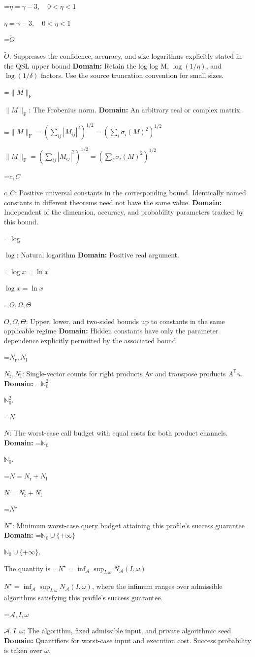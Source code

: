 \documentclass[10pt,a4paper]{article}
\newcommand{\AtlasMath}[1]{\par\begingroup\centering\setbox0=\hbox{$\displaystyle #1$}\ifdim\wd0>1.4\linewidth\typeout{ATLAS WIDE FORMULA: \the\wd0}\fi\ifdim\wd0>\linewidth\resizebox{\linewidth}{!}{\box0}\else\box0\fi\par\endgroup}
\newcommand{\AtlasInlineMath}[1]{\begingroup\setbox0=\hbox{$#1$}\ifdim\wd0>.4\linewidth\endgroup\AtlasMath{#1}\else\endgroup$#1$\fi}
\begin{document}
\AtlasInlineMath{\eta=\gamma-3,\quad0<\eta<1}

\AtlasInlineMath{\widetilde O}: Suppresses the confidence, accuracy, and size logarithms explicitly stated in the QSL upper bound \textbf{Domain:} Retain the log log M, $\log(1/\eta )$, and $\log(1/\delta )$ factors. Use the source truncation convention for small sizes.

\AtlasInlineMath{\|M\|_{\mathrm F}}: The Frobenius norm. \textbf{Domain:} An arbitrary real or complex matrix.

\AtlasInlineMath{\|M\|_{\mathrm F}=(\sum_{ij}|M_{ij}|^2)^{1/2}=(\sum_i\sigma_i(M)^2)^{1/2}}

\AtlasInlineMath{c,C}: Positive universal constants in the corresponding bound. Identically named constants in different theorems need not have the same value. \textbf{Domain:} Independent of the dimension, accuracy, and probability parameters tracked by this bound.

\AtlasInlineMath{\log}: Natural logarithm \textbf{Domain:} Positive real argument.

\AtlasInlineMath{\log x=\ln x}

\AtlasInlineMath{O,\Omega,\Theta}: Upper, lower, and two-sided bounds up to constants in the same applicable regime \textbf{Domain:} Hidden constants have only the parameter dependence explicitly permitted by the associated bound.

\AtlasInlineMath{N_{\mathrm r},N_{\mathrm l}}: Single-vector counts for right products Av and transpose products $A^{\mathsf T}u$. \textbf{Domain:} \AtlasInlineMath{\mathbb N_0^2}.

\AtlasInlineMath{N}: The worst-case call budget with equal costs for both product channels. \textbf{Domain:} \AtlasInlineMath{\mathbb N_0}.

\AtlasInlineMath{N=N_{\mathrm r}+N_{\mathrm l}}

\AtlasInlineMath{N^\star}: Minimum worst-case query budget attaining this profile's success guarantee \textbf{Domain:} \AtlasInlineMath{\mathbb N_0\cup\{+\infty\}}.

The quantity is \AtlasInlineMath{N^\star=\inf_{\mathcal A}\sup_{I,\omega}N_{\mathcal A}(I,\omega)}, where the infimum ranges over admissible algorithms satisfying this profile's success guarantee.

\AtlasInlineMath{\mathcal A,I,\omega}: The algorithm, fixed admissible input, and private algorithmic seed. \textbf{Domain:} Quantifiers for worst-case input and execution cost. Success probability is taken over $\omega$.
\end{document}
